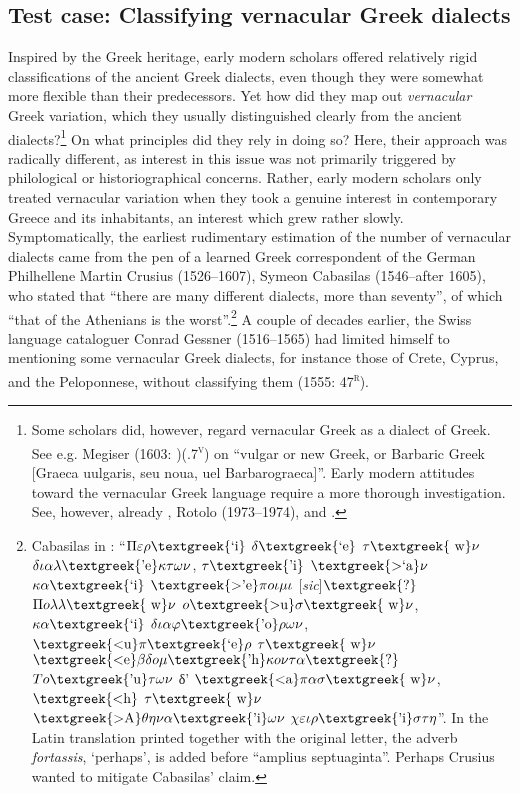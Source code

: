 \documentclass[output=paper]{langsci/langscibook}
\begin{document}
\subsection{Test case: Classifying vernacular Greek dialects}
\hypertarget{Toc19704816}{}
Inspired by the Greek heritage, early modern scholars offered relatively rigid classifications of the ancient Greek dialects, even though they were somewhat more flexible than their predecessors. Yet how did they map out \textit{vernacular} Greek variation, which they usually distinguished clearly from the ancient dialects?\footnote{Some scholars did, however, regard vernacular Greek as a dialect of Greek. See e.g. Megiser (1603: )(.7\textsc{\textsuperscript{v}}) on “vulgar or new Greek, or Barbaric Greek [Graeca uulgaris, seu noua, uel Barbarograeca]”. Early modern attitudes toward the vernacular Greek language require a more thorough investigation. See, however, already \citet{Caratzas1952}, Rotolo (1973–1974), and \citet{Toufexis2005}.} On what principles did they rely in doing so? Here, their approach was radically different, as interest in this issue was not primarily triggered by philological or historiographical concerns. Rather, early modern scholars only treated vernacular variation when they took a genuine interest in contemporary Greece and its inhabitants, an interest which grew rather slowly. Symptomatically, the earliest rudimentary estimation of the number of vernacular dialects came from the pen of a learned Greek correspondent of the German Philhellene Martin Crusius (1526–1607), Symeon Cabasilas (1546–after 1605), who stated that “there are many different dialects, more than seventy”, of which “that of the Athenians is the worst”.\footnote{Cabasilas in \citet[461]{Crusius1584}: “$\Pi \varepsilon \rho \text{\textgreek{`i}}$ $\delta \text{\textgreek{`e}}$ $\tau \text{\textgreek{~w}}\nu $ $\delta \iota \alpha \lambda \text{\textgreek{'e}}\kappa \tau \omega \nu $, $\tau \text{\textgreek{'i}}$ $\text{\textgreek{>`a}}\nu $ $\kappa \alpha \text{\textgreek{`i}}$ $\text{\textgreek{>'e}}\pi o\iota \mu \iota $ [\textit{sic}]$\text{\textgreek{?}}$ $\Pi o\lambda \lambda \text{\textgreek{~w}}\nu $ $o\text{\textgreek{>u}}\sigma \text{\textgreek{~w}}\nu $, $\kappa \alpha \text{\textgreek{`i}}$ $\delta \iota \alpha \varphi \text{\textgreek{'o}}\rho \omega \nu $, $\text{\textgreek{<u}}\pi \text{\textgreek{`e}}\rho $ $\tau \text{\textgreek{~w}}\nu $ $\text{\textgreek{<e}}\beta \delta o\mu \text{\textgreek{'h}}\kappa o\nu \tau \alpha \text{\textgreek{?}}$ $To\text{\textgreek{'u}}\tau \omega \nu $ δ' $\text{\textgreek{<a}}\pi \alpha \sigma \text{\textgreek{~w}}\nu $, $\text{\textgreek{<h}}$ $\tau \text{\textgreek{~w}}\nu $ $\text{\textgreek{>A}}\theta \eta \nu \alpha \text{\textgreek{'i}}\omega \nu $ $\chi \varepsilon \iota \rho \text{\textgreek{'i}}\sigma \tau \eta $”. In the Latin translation printed together with the original letter, the adverb \textit{fortassis}, ‘perhaps’, is added before “amplius septuaginta”. Perhaps Crusius wanted to mitigate Cabasilas’ claim.} A couple of decades earlier, the Swiss language cataloguer Conrad Gessner (1516–1565) had limited himself to mentioning some vernacular Greek dialects, for instance those of Crete, Cyprus, and the Peloponnese, without classifying them (1555: 47\textsc{\textsuperscript{r}}).
\end{document}

